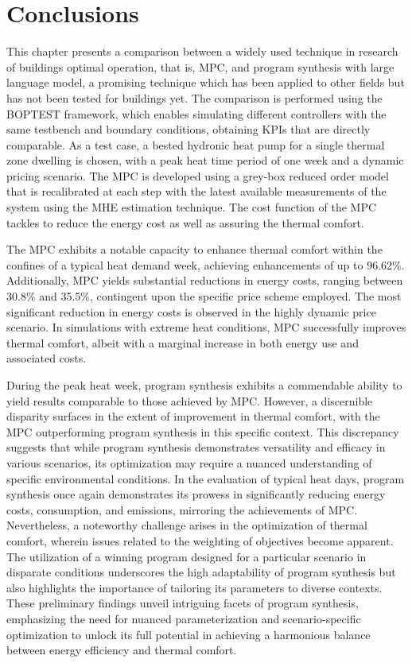 \section{Conclusions}
\label{sec:conclusion}
This chapter presents a comparison between a widely used technique in research of buildings optimal operation, that is, MPC, and program synthesis with large language model, a promising technique which has been applied to other fields but has not been tested for buildings yet. The comparison is performed using the BOPTEST framework, which enables simulating different controllers with the same testbench and boundary conditions, obtaining KPIs that are directly comparable. As a test case, a bested hydronic heat pump for a single thermal zone dwelling is chosen, with a peak heat time period of one week and a dynamic pricing scenario. The MPC is developed using a grey-box reduced order model that is recalibrated at each step with the latest available measurements of the system using the MHE estimation technique. The cost function of the MPC tackles to reduce the energy cost as well as assuring the thermal comfort. 

The MPC exhibits a notable capacity to enhance thermal comfort within the confines of a typical heat demand week, achieving enhancements of up to 96.62\%. Additionally, MPC yields substantial reductions in energy costs, ranging between 30.8\% and 35.5\%, contingent upon the specific price scheme employed. The most significant reduction in energy costs is observed in the highly dynamic price scenario. In simulations with extreme heat conditions, MPC successfully improves thermal comfort, albeit with a marginal increase in both energy use and associated costs.

During the peak heat week, program synthesis exhibits a commendable ability to yield results comparable to those achieved by MPC. However, a discernible disparity surfaces in the extent of improvement in thermal comfort, with the MPC outperforming program synthesis in this specific context. This discrepancy suggests that while program synthesis demonstrates versatility and efficacy in various scenarios, its optimization may require a nuanced understanding of specific environmental conditions. In the evaluation of typical heat days, program synthesis once again demonstrates its prowess in significantly reducing energy costs, consumption, and emissions, mirroring the achievements of MPC. Nevertheless, a noteworthy challenge arises in the optimization of thermal comfort, wherein issues related to the weighting of objectives become apparent. The utilization of a winning program designed for a particular scenario in disparate conditions underscores the high adaptability of program synthesis but also highlights the importance of tailoring its parameters to diverse contexts. These preliminary findings unveil intriguing facets of program synthesis, emphasizing the need for nuanced parameterization and scenario-specific optimization to unlock its full potential in achieving a harmonious balance between energy efficiency and thermal comfort.
